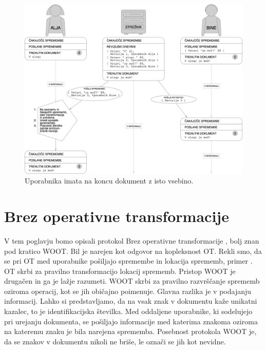 \documentclass[a4paper, 12pt, twoside]{book}
\begin{document}
\begin{figure}[placement h]
\begin{center}
\includegraphics[width=14cm]{pc6.png}
\end{center}
\caption{Uporabnika imata na koncu dokument z isto vsebino.}
\label{pc6}
\end{figure}

\pagebreak

\section{Brez operativne transformacije}
\label{sec:woot}

V tem poglavju bomo opisali protokol Brez operativne transformacije \cite{woot}, bolj znan pod kratico WOOT. Bil je narejen kot odgovor na kopleksnost OT. Rekli smo, da se \linebreak pri OT med uporabnike pošiljajo spremembe in lokacija sprememb, primer . OT skrbi za pravilno transformacijo lokacij sprememb. Pristop WOOT je drugačen in ga je lažje razumeti. WOOT skrbi za pravilno razvrščanje sprememb oziroma operacij, kot se jih običajno poimenuje. Glavna razlika je v podajanju informacij. Lahko si predstavljamo, da na vsak znak v dokumentu kaže unikatni kazalec, to je identifikacijska številka. Med oddaljene uporabnike, ki sodelujejo pri urejanju dokumenta, se pošiljajo informacije med katerima znakoma oziroma na kateremu znaku je bila narejena sprememba. Posebnost protokola WOOT je, da se znakov v dokumentu nikoli ne briše, le označi se jih kot nevidne.
\end{document}
